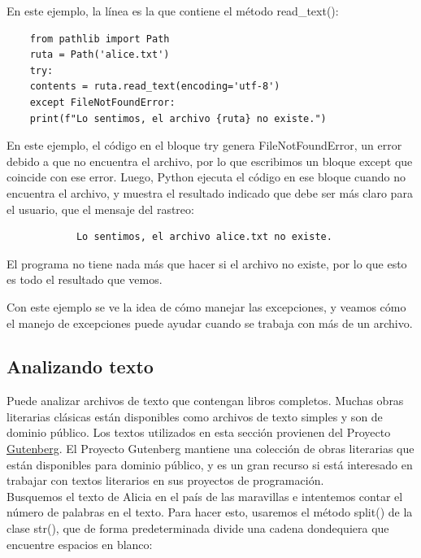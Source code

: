 En este ejemplo,  la línea es la que contiene el método {\ttfamily read\_text()}:

\begin{lstlisting}
	from pathlib import Path
	ruta = Path('alice.txt')
	try:
	contents = ruta.read_text(encoding='utf-8')
	except FileNotFoundError:
	print(f"Lo sentimos, el archivo {ruta} no existe.")
\end{lstlisting}

En este ejemplo, el código en el bloque {\ttfamily try} genera {\ttfamily FileNotFoundError}, un error debido a que no encuentra el archivo, por lo que escribimos un bloque {\ttfamily except} que coincide con ese error. Luego, Python ejecuta el código en ese bloque cuando no encuentra el archivo, y muestra el resultado indicado que debe ser más claro para el usuario, que el mensaje del rastreo:
{\ttfamily\scriptsize\scriptsize 
	\hspace{-0.65cm} \vspace{-0.3cm}	
	{\color{blue} 	
		\begin{verbatim}
			Lo sentimos, el archivo alice.txt no existe.	
		\end{verbatim}
}}

El programa no tiene nada más que hacer si el archivo no existe, por lo que esto es todo el resultado que vemos.

Con este ejemplo se ve la idea de cómo manejar las excepciones, y veamos cómo el manejo de excepciones puede ayudar cuando se trabaja con más de un archivo. 


\subsection{Analizando texto}
Puede analizar archivos de texto que contengan libros completos. Muchas obras literarias clásicas están disponibles como archivos de texto simples y son de dominio público. Los textos utilizados en esta sección provienen del Proyecto  \href{https://gutenberg.org}{\color{vino} Gutenberg}. El Proyecto Gutenberg mantiene una colección de obras literarias que están disponibles para dominio público, y es un gran recurso si está interesado en trabajar con textos literarios en sus proyectos de programación.\\

Busquemos el texto de Alicia en el país de las maravillas e intentemos contar el número
de palabras en el texto. Para hacer esto, usaremos el método {\ttfamily split()} de la clase {\ttfamily str()}, que
de forma predeterminada divide una cadena dondequiera que encuentre espacios en blanco:

